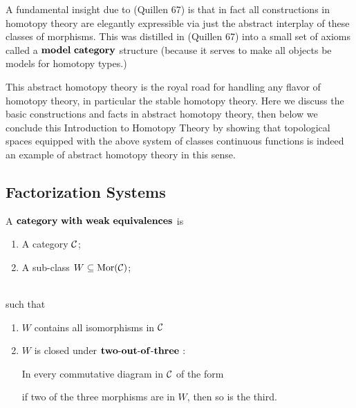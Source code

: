     \par A fundamental insight due to (Quillen 67) is that in fact
    all constructions in homotopy theory are elegantly expressible
    via just the abstract interplay of these classes of morphisms.
    This was distilled in (Quillen 67) into
    a small set of axioms called a $\mathbf{model\ category}$ structure
    (because it serves to make all objects be models for homotopy types.)

    \par This abstract homotopy theory is the royal road for
    handling any flavor of homotopy theory,
    in particular the stable homotopy theory.
    Here we discuss the basic constructions and facts in abstract homotopy theory,
    then below we conclude this Introduction to Homotopy Theory by
    showing that topological spaces equipped with the above system of
    classes continuous functions is indeed an example of
    abstract homotopy theory in this sense.


    \subsection{Factorization Systems}

    \begin{defn}
        A $\mbf{category\ with\ weak\ equivalences}$ is
        \begin{enumerate}
            \item A category $\mathcal{C}$;
            \item A sub-class $W \subseteq \operatorname{\rm{Mor}}(\mathcal{C})$;
        \end{enumerate}
        \ \\
        such that
        \begin{enumerate}
            \item $W$ contains all isomorphisms in $\mathcal{C}$
            \item $W$ is closed under $\mathbf{two\text{-}out\text{-} of\text{-} three}$ :
            \par In every commutative diagram in $\mathcal{C}$ of the form

            if two of the three morphisms are in $W$, then so is the third.

        \end{enumerate}

    \end{defn}

